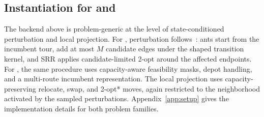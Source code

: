 
\subsection{Instantiation for \TSP{} and \CVRP{}}
\label{sec:routing-instantiation}

The backend above is problem-generic at the level of state-conditioned perturbation and local projection. For \TSP{}, perturbation follows~\cite{faco}: ants start from the incumbent tour, add at most $M$ candidate edges under the shaped transition kernel, and SRR applies candidate-limited 2-opt around the affected endpoints. For \CVRP{}, the same procedure uses capacity-aware feasibility masks, depot handling, and a multi-route incumbent representation. The local projection uses capacity-preserving relocate, swap, and 2-opt* moves, again restricted to the neighborhood activated by the sampled perturbations. Appendix~\ref{app:setup} gives the implementation details for both problem families.

